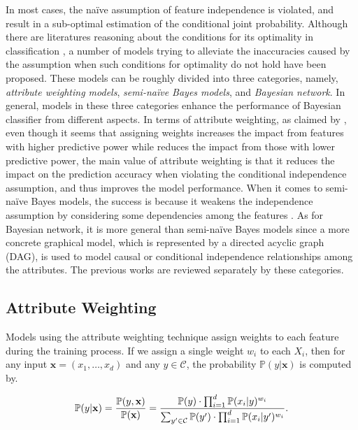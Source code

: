 \documentclass[twoside,11pt]{article}
\begin{document}
In most cases, the na\"ive assumption of feature independence is violated, and result in a sub-optimal estimation of the conditional joint probability. Although there are literatures reasoning about the conditions for its optimality in classification \citep{domingos1996beyond,domingos1997optimality,zhang2004optimality}, a number of models trying to alleviate the inaccuracies caused by the assumption when such conditions for optimality do not hold have been proposed. These models can be roughly divided into three categories, namely, \textit{attribute weighting models}, \textit{semi-na\"ive Bayes models}, and \textit{Bayesian network}. In general, models in these three categories enhance the performance of Bayesian classifier from different aspects. In terms of attribute weighting, as claimed by \citet{zaidi2013alleviating}, even though it seems that assigning weights increases the impact from features with higher predictive power while reduces the impact from those with lower predictive power, the main value of attribute weighting is that it reduces the impact on the prediction accuracy when violating the conditional independence assumption, and thus improves the model performance. When it comes to semi-na\"ive Bayes models, the success is because it weakens the independence assumption by considering some dependencies among the features \citep{zheng2005comparative}. As for Bayesian network, it is more general than semi-na\"ive Bayes models since a more concrete graphical model, which is represented by a directed acyclic graph (DAG), is used to model causal or conditional independence relationships among the attributes. The previous works are reviewed separately by these categories.

\subsection{Attribute Weighting}
Models using the attribute weighting technique assign weights to each feature during the training process. If we assign a single weight $w_i$ to each $X_i$, then for any input $\mathbf{x}=(x_1,\dots,x_d)$ and any $y\in\mathcal{C}$, the probability $\mathbb{P}(y|\mathbf{x})$ is computed by.

\begin{equation*}
    \centering
    \mathbb{P}(y|\mathbf{x})=\frac{\mathbb{P}(y,\mathbf{x})}{\mathbb{P}(\mathbf{x})}=\frac{\mathbb{P}(y)\cdot\prod_{i=1}^{d}\mathbb{P}(x_i|y)^{w_i}}{\sum_{y'\in\mathcal{C}}\mathbb{P}(y')\cdot\prod_{i=1}^{d}\mathbb{P}(x_i|y')^{w_i}}.
\end{equation*}
\end{document}
